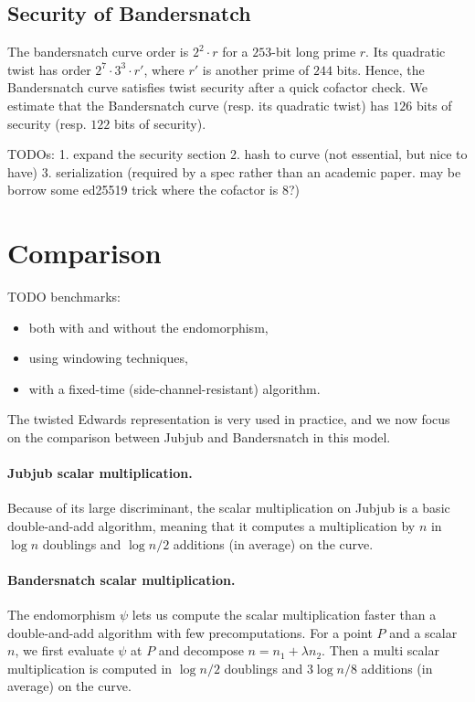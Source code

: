 \documentclass{article}
\newcommand{\SM}[1]{\color{blue}#1\color{black}}
\newcommand{\ZZ}[1]{\color{cyan}#1\color{black}}
\theoremstyle{definition}
\begin{document}
\subsection{Security of Bandersnatch}

The bandersnatch curve order is $2^2\cdot r$ for a $253$-bit long
prime $r$.
Its quadratic twist has order
$2^7 \cdot 3^3 \cdot r'$, where $r'$ is another prime of $244$ bits.
Hence, the Bandersnatch curve satisfies twist security after a quick cofactor
check.
We estimate that the Bandersnatch curve (resp. its quadratic twist)
has $126$ bits of security (resp. $122$ bits of security).

\ZZ{TODOs: 1. expand the security section 2. hash to curve (not essential, but nice to have)
3. serialization (required by a spec rather than an academic paper. may be borrow 
some ed25519 trick where the cofactor is 8?)}

\section{Comparison}\label{sec:comparison}

\SM{TODO benchmarks:}
\begin{itemize}
\item both with and without the endomorphism,
\item using windowing techniques,
\item with a fixed-time (side-channel-resistant) algorithm.
\end{itemize}

The twisted Edwards representation is very used in practice, and we
now focus on the comparison between Jubjub and Bandersnatch in this
model.

\paragraph{Jubjub scalar multiplication.}
Because of its large discriminant, the scalar multiplication on Jubjub
is a basic double-and-add algorithm, meaning that it computes a
multiplication by $n$ in $\log n$ doublings and $\log n/2$
additions (in average) on the curve. 

\paragraph{Bandersnatch scalar multiplication.}
The endomorphism $\psi$ lets us compute the scalar multiplication
faster than a double-and-add algorithm with few precomputations. For a
point $P$ and a scalar $n$, we first evaluate $\psi$ at $P$ and
decompose $n = n_1 + \lambda n_2$. Then a multi scalar multiplication
is computed in $\log n/2$ doublings and $3\log n/8$ additions (in average) on the curve.
\end{document}
